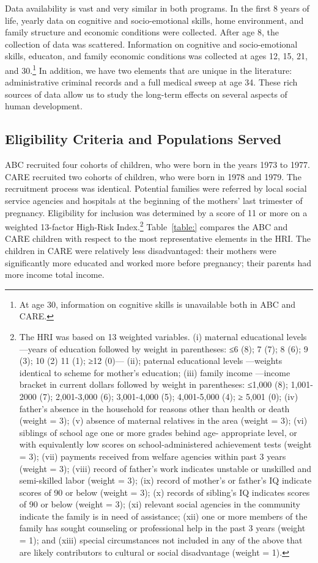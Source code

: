\noindent Data availability is vast and very similar in both programs. In the first 8 years of life, yearly data on cognitive and socio-emotional skills, home environment, and family structure and economic conditions were collected. After age 8, the collection of data was scattered. Information on cognitive and socio-emotional skills, educaton, and family economic conditions was collected at ages 12, 15, 21, and 30.\footnote{At age 30, information on cognitive skills is unavailable both in ABC and CARE.} In addition, we have two elements that are unique in the literature: administrative criminal records and a full medical sweep at age 34. These rich sources of data allow us to study the long-term effects on several aspects of human development.

\subsection{Eligibility Criteria and Populations Served}

\noindent ABC recruited four cohorts of children, who were born in the years 1973 to 1977. CARE recruited two cohorts of children, who were born in 1978 and 1979. The recruitment process was identical. Potential families were referred by local social service agencies and hospitals at the beginning of the mothers' last trimester of pregnancy. Eligibility for inclusion was determined by a score of 11 or more on a weighted 13-factor High-Risk Index.\footnote{The HRI was based on 13 weighted variables. (i) maternal educational levels —years of education followed by weight in parentheses: ≤6 (8); 7 (7); 8 (6); 9 (3); 10 (2) 11 (1); ≥12 (0)— (ii); paternal educational levels —weights identical to scheme for mother’s education; (iii) family income —income bracket in current dollars followed by weight in parentheses: ≤1,000 (8); 1,001-2000 (7); 2,001-3,000 (6); 3,001-4,000 (5); 4,001-5,000 (4); ≥ 5,001 (0); (iv) father’s absence in the household for reasons other than health or death (weight = 3); (v) absence of maternal relatives in the area (weight = 3); (vi) siblings of school age one or more grades behind age- appropriate level, or with equivalently low scores on school-administered achievement tests (weight = 3); (vii) payments received from welfare agencies within past 3 years (weight = 3); (viii) record of father’s work indicates unstable or unskilled and semi-skilled labor (weight = 3); (ix) record of mother’s or father’s IQ indicate scores of 90 or below (weight = 3); (x) records of sibling’s IQ indicates scores of 90 or below (weight = 3); (xi) relevant social agencies in the community indicate the family is in need of assistance; (xii) one or more members of the family has sought counseling or professional help in the past 3 years (weight = 1); and (xiii) special circumstances not included in any of the above that are likely contributors to cultural or social disadvantage (weight = 1).} Table~\ref{table:} compares the ABC and CARE children with respect to the most representative elements in the HRI. The children in CARE were relatively less disadvantaged: their mothers were significantly more educated and worked more before pregnancy; their parents had more income total income.\\

